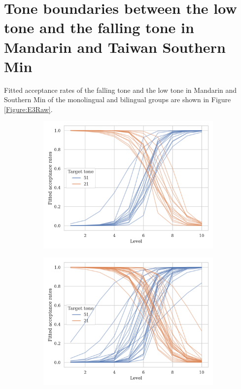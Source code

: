 \section{Tone boundaries between the low tone and the falling tone in Mandarin and Taiwan Southern Min}

Fitted acceptance rates of the falling tone and the low tone in Mandarin and Southern Min of the monolingual and bilingual groups are shown in Figure \ref{Figure:E3Raw}.

\begin{figure}[hbt!]
\centering
\begin{subfigure}[b]{.45\textwidth}
\centering
\includegraphics[width=\textwidth]{figures/E3/Mandarin_monolingual_E3_raw.png}
\end{subfigure}
\hfill
\begin{subfigure}[b]{.45\textwidth}
\centering
\includegraphics[width=\textwidth]{figures/E3/Mandarin_bilingual_E3_raw.png}

\end{subfigure}
\end{figure}
